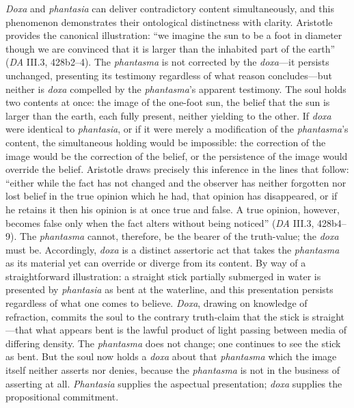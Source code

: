 \documentclass{article}
\begin{document}
\textit{Doxa} and \textit{phantasia} can deliver contradictory content simultaneously, and this phenomenon demonstrates their ontological distinctness with clarity. Aristotle provides the canonical illustration: ``we imagine the sun to be a foot in diameter though we are convinced that it is larger than the inhabited part of the earth'' (\textit{DA} III.3, 428b2--4). The \textit{phantasma} is not corrected by the \textit{doxa}---it persists unchanged, presenting its testimony regardless of what reason concludes---but neither is \textit{doxa} compelled by the \textit{phantasma}'s apparent testimony. The soul holds two contents at once: the image of the one-foot sun, the belief that the sun is larger than the earth, each fully present, neither yielding to the other. If \textit{doxa} were identical to \textit{phantasia}, or if it were merely a modification of the \textit{phantasma}'s content, the simultaneous holding would be impossible: the correction of the image would be the correction of the belief, or the persistence of the image would override the belief. Aristotle draws precisely this inference in the lines that follow: ``either while the fact has not changed and the observer has neither forgotten nor lost belief in the true opinion which he had, that opinion has disappeared, or if he retains it then his opinion is at once true and false. A true opinion, however, becomes false only when the fact alters without being noticed'' (\textit{DA} III.3, 428b4--9). The \textit{phantasma} cannot, therefore, be the bearer of the truth-value; the \textit{doxa} must be. Accordingly, \textit{doxa} is a distinct assertoric act that takes the \textit{phantasma} as its material yet can override or diverge from its content. By way of a straightforward illustration: a straight stick partially submerged in water is presented by \textit{phantasia} as bent at the waterline, and this presentation persists regardless of what one comes to believe. \textit{Doxa}, drawing on knowledge of refraction, commits the soul to the contrary truth-claim that the stick is straight---that what appears bent is the lawful product of light passing between media of differing density. The \textit{phantasma} does not change; one continues to see the stick as bent. But the soul now holds a \textit{doxa} about that \textit{phantasma} which the image itself neither asserts nor denies, because the \textit{phantasma} is not in the business of asserting at all. \textit{Phantasia} supplies the aspectual presentation; \textit{doxa} supplies the propositional commitment.
\end{document}
